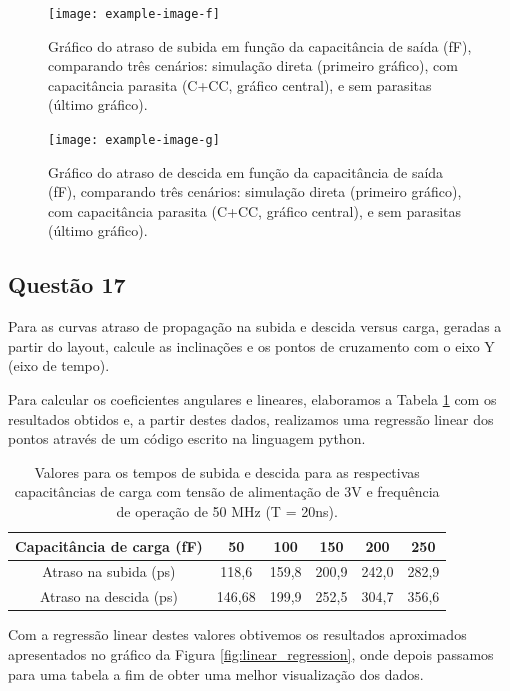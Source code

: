\documentclass[12pt,a4paper]{article}
\begin{document}
\begin{figure}[H]
    \centering
    \texttt{[image: example-image-f]}
    \caption{Gráfico do atraso de subida em função da capacitância de saída (fF), comparando três cenários: simulação direta (primeiro gráfico), com capacitância parasita (C+CC, gráfico central), e sem parasitas (último gráfico).}
    \label{fig:delay_subida_cc}
\end{figure}

\begin{figure}[H]
    \centering
    \texttt{[image: example-image-g]}
    \caption{Gráfico do atraso de descida em função da capacitância de saída (fF), comparando três cenários: simulação direta (primeiro gráfico), com capacitância parasita (C+CC, gráfico central), e sem parasitas (último gráfico).}
    \label{fig:delay_descida_cc}
\end{figure}

\subsection*{Questão 17}

Para as curvas atraso de propagação na subida e descida versus carga, geradas a partir do layout, calcule as inclinações e os pontos de cruzamento com o eixo Y (eixo de tempo).

Para calcular os coeficientes angulares e lineares, elaboramos a Tabela \ref{tab:delay_values} com os resultados obtidos e, a partir destes dados, realizamos uma regressão linear dos pontos através de um código escrito na linguagem python.

\begin{table}[H]
    \centering
    \caption{Valores para os tempos de subida e descida para as respectivas capacitâncias de carga com tensão de alimentação de 3V e frequência de operação de 50 MHz (T = 20ns).}
    \label{tab:delay_values}
    \begin{tabular}{cccccc}
        \toprule
        Capacitância de carga (fF) & 50 & 100 & 150 & 200 & 250 \\
        \midrule
        Atraso na subida (ps) & 118,6 & 159,8 & 200,9 & 242,0 & 282,9 \\
        Atraso na descida (ps) & 146,68 & 199,9 & 252,5 & 304,7 & 356,6 \\
        \bottomrule
    \end{tabular}
\end{table}

Com a regressão linear destes valores obtivemos os resultados aproximados apresentados no gráfico da Figura \ref{fig:linear_regression}, onde depois passamos para uma tabela a fim de obter uma melhor visualização dos dados.
\end{document}
